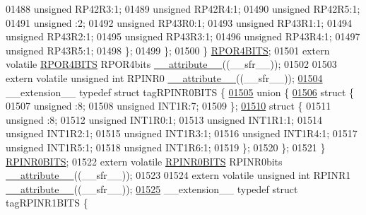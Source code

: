 \begin{DoxyCode}
01488       \textcolor{keywordtype}{unsigned} RP42R3:1;
01489       \textcolor{keywordtype}{unsigned} RP42R4:1;
01490       \textcolor{keywordtype}{unsigned} RP42R5:1;
01491       \textcolor{keywordtype}{unsigned} :2;
01492       \textcolor{keywordtype}{unsigned} RP43R0:1;
01493       \textcolor{keywordtype}{unsigned} RP43R1:1;
01494       \textcolor{keywordtype}{unsigned} RP43R2:1;
01495       \textcolor{keywordtype}{unsigned} RP43R3:1;
01496       \textcolor{keywordtype}{unsigned} RP43R4:1;
01497       \textcolor{keywordtype}{unsigned} RP43R5:1;
01498     \};
01499   \};
01500 \} \hyperlink{a00008_da/df2/a00751}{RPOR4BITS};
01501 \textcolor{keyword}{extern} \textcolor{keyword}{volatile} \hyperlink{a00008_da/df2/a00751}{RPOR4BITS} RPOR4bits \hyperlink{a00009_a493c46f03454991ccc5aa7a6e1dfb2a7}{\_\_attribute\_\_}((\_\_sfr\_\_));
01502 
01503 \textcolor{keyword}{extern} \textcolor{keyword}{volatile} \textcolor{keywordtype}{unsigned} \textcolor{keywordtype}{int}  RPINR0 \hyperlink{a00009_a493c46f03454991ccc5aa7a6e1dfb2a7}{\_\_attribute\_\_}((\_\_sfr\_\_));
\hypertarget{a00009_source_l01504}{}\hyperlink{a00008}{01504} \_\_extension\_\_ \textcolor{keyword}{typedef} \textcolor{keyword}{struct }tagRPINR0BITS \{
\hypertarget{a00009_source_l01505}{}\hyperlink{a00009}{01505}   \textcolor{keyword}{union }\{
\hypertarget{a00009_source_l01506}{}\hyperlink{a00009}{01506}     \textcolor{keyword}{struct }\{
01507       \textcolor{keywordtype}{unsigned} :8;
01508       \textcolor{keywordtype}{unsigned} INT1R:7;
01509     \};
\hypertarget{a00009_source_l01510}{}\hyperlink{a00009}{01510}     \textcolor{keyword}{struct }\{
01511       \textcolor{keywordtype}{unsigned} :8;
01512       \textcolor{keywordtype}{unsigned} INT1R0:1;
01513       \textcolor{keywordtype}{unsigned} INT1R1:1;
01514       \textcolor{keywordtype}{unsigned} INT1R2:1;
01515       \textcolor{keywordtype}{unsigned} INT1R3:1;
01516       \textcolor{keywordtype}{unsigned} INT1R4:1;
01517       \textcolor{keywordtype}{unsigned} INT1R5:1;
01518       \textcolor{keywordtype}{unsigned} INT1R6:1;
01519     \};
01520   \};
01521 \} \hyperlink{a00008_d6/dd3/a00688}{RPINR0BITS};
01522 \textcolor{keyword}{extern} \textcolor{keyword}{volatile} \hyperlink{a00008_d6/dd3/a00688}{RPINR0BITS} RPINR0bits \hyperlink{a00009_a493c46f03454991ccc5aa7a6e1dfb2a7}{\_\_attribute\_\_}((\_\_sfr\_\_));
01523 
01524 \textcolor{keyword}{extern} \textcolor{keyword}{volatile} \textcolor{keywordtype}{unsigned} \textcolor{keywordtype}{int}  RPINR1 \hyperlink{a00009_a493c46f03454991ccc5aa7a6e1dfb2a7}{\_\_attribute\_\_}((\_\_sfr\_\_));
\hypertarget{a00009_source_l01525}{}\hyperlink{a00008}{01525} \_\_extension\_\_ \textcolor{keyword}{typedef} \textcolor{keyword}{struct }tagRPINR1BITS \{

\end{DoxyCode}
